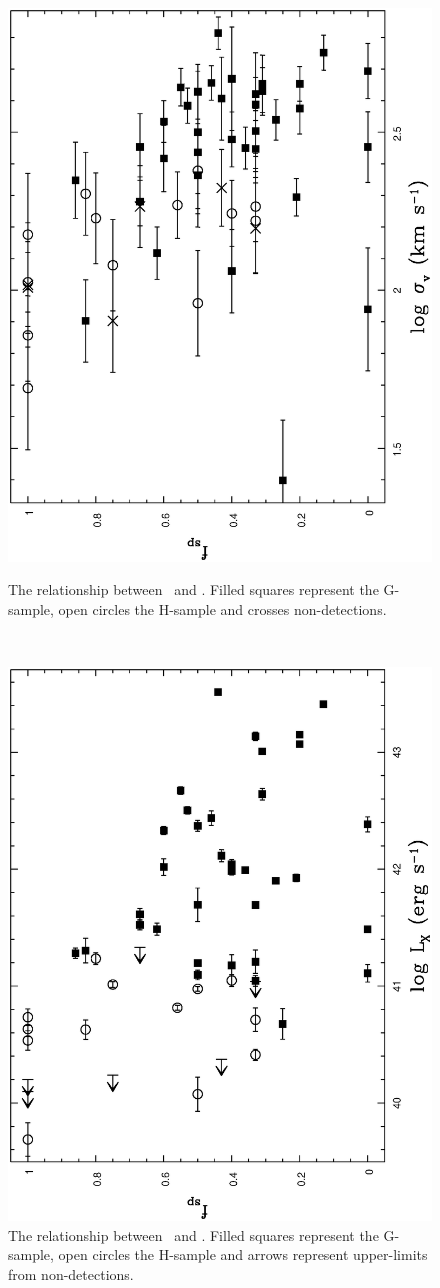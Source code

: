 \documentclass[usenatbib]{mn2e}
\begin{document}
\begin{figure}
\begin{minipage}{241pt}
    \includegraphics[height=\linewidth,angle=270]{fig_23.ps}
    \caption{The relationship between \fsp\ and \sigmav.  Filled squares
             represent the G-sample, open circles the H-sample and crosses
             non-detections.}
    \label{fig_fsp_sigma}

  \end{minipage}\\
  \begin{minipage}{241pt}
  \centering

    \includegraphics[height=\linewidth,angle=270]{fig_24.ps}
    \caption{The relationship between \fsp\ and \LX.  Filled squares
             represent the G-sample, open circles the H-sample and arrows
             represent upper-limits from non-detections.}
    \label{fig_fsp_LX}


\end{minipage}
\end{figure}
\end{document}
